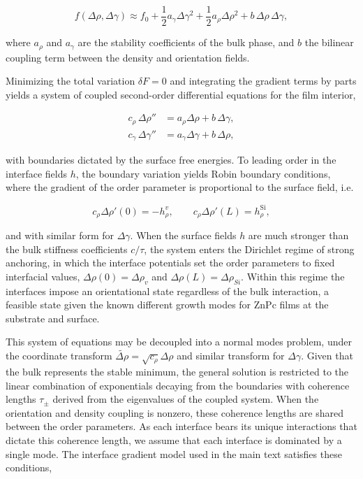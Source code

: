 \begin{equation}
  f(\Delta\rho,\Delta\gamma) \approx f_{0} + \frac{1}{2}a_{\gamma}\Delta\gamma^{2} + \frac{1}{2}a_{\rho}\Delta\rho^{2} + b\,\Delta\rho\,\Delta\gamma,
  \label{eq:local-free-energy}
\end{equation}

where \(a_{\rho}\) and \(a_{\gamma}\) are the stability coefficients of the bulk phase, and \(b\) the bilinear coupling term between the density and orientation fields.

Minimizing the total variation \(\delta F = 0\) and integrating the gradient terms by parts yields a system of coupled second-order differential equations for the film interior,

\begin{align}
  c_{\rho}\,\Delta\rho'' &= a_{\rho}\Delta\rho + b\,\Delta\gamma, \label{eq:el-rho}\\
  c_{\gamma}\,\Delta\gamma'' &= a_{\gamma}\Delta\gamma + b\,\Delta\rho, \label{eq:el-gamma}
\end{align}

with boundaries dictated by the surface free energies. To leading order in the interface fields \(h\), the boundary variation yields Robin boundary conditions, where the gradient of the order parameter is proportional to the surface field, i.e.

\begin{equation}
  c_{\rho}\Delta\rho'(0) = - h_{\rho}^{v}, \qquad c_{\rho}\Delta\rho'(L) = h_{\rho}^{\mathrm{Si}},
  \label{eq:robin}
\end{equation}

and with similar form for \(\Delta\gamma\). When the surface fields \(h\) are much stronger than the bulk stiffness coefficients \(c/\tau\), the system enters the Dirichlet regime of strong anchoring, in which the interface potentials set the order parameters to fixed interfacial values, \(\Delta\rho(0) = {\Delta\rho}_{v}\) and \(\Delta\rho(L) = {\Delta\rho}_{Si}\). Within this regime the interfaces impose an orientational state regardless of the bulk interaction, a feasible state given the known different growth modes for ZnPc films at the substrate and surface.\autocite{derrienInterfacialRearrangementsStrain2022,yangMolecularOrientationInducedRapidRoughening2015}

This system of equations may be decoupled into a normal modes problem, under the coordinate transform \(\widetilde{\Delta\rho} = \sqrt{c_{\rho}}\Delta\rho\) and similar transform for \(\Delta\gamma\). Given that the bulk represents the stable minimum, the general solution is restricted to the linear combination of exponentials decaying from the boundaries with coherence lengths \(\tau_{\pm}\) derived from the eigenvalues of the coupled system. When the orientation and density coupling is nonzero, these coherence lengths are shared between the order parameters. As each interface bears its unique interactions that dictate this coherence length, we assume that each interface is dominated by a single mode. The interface gradient model used in the main text satisfies these conditions,

